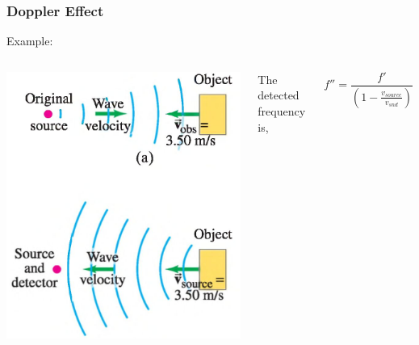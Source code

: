\documentclass[]{beamer}
\begin{document}
\begin{frame}
\frametitle{Doppler Effect}

Example: 

\vspace{3mm}

   \begin{columns}[c]
   \column{2in}  %
  \begin{center}
  \includegraphics[height=2.in]{images4/doppler7.jpg}
\end{center}


  
   \column{2in}


The detected frequency is,

\begin{equation*}
f''=\frac{f'}{(1-\frac{v_{source}}{v_{snd}})}
\end{equation*}

   \end{columns}




  \end{frame}
\end{document}
